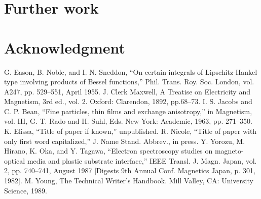 \documentclass[conference]{IEEEtran}
\begin{document}
\section{Further work}





\section*{Acknowledgment}





\begin{thebibliography}{00}
 G. Eason, B. Noble, and I. N. Sneddon, ``On certain integrals of Lipschitz-Hankel type involving products of Bessel functions,'' Phil. Trans. Roy. Soc. London, vol. A247, pp. 529--551, April 1955.
 J. Clerk Maxwell, A Treatise on Electricity and Magnetism, 3rd ed., vol. 2. Oxford: Clarendon, 1892, pp.68--73.
 I. S. Jacobs and C. P. Bean, ``Fine particles, thin films and exchange anisotropy,'' in Magnetism, vol. III, G. T. Rado and H. Suhl, Eds. New York: Academic, 1963, pp. 271--350.
 K. Elissa, ``Title of paper if known,'' unpublished.
 R. Nicole, ``Title of paper with only first word capitalized,'' J. Name Stand. Abbrev., in press.
 Y. Yorozu, M. Hirano, K. Oka, and Y. Tagawa, ``Electron spectroscopy studies on magneto-optical media and plastic substrate interface,'' IEEE Transl. J. Magn. Japan, vol. 2, pp. 740--741, August 1987 [Digests 9th Annual Conf. Magnetics Japan, p. 301, 1982].
 M. Young, The Technical Writer's Handbook. Mill Valley, CA: University Science, 1989.
\end{thebibliography}
\end{document}
